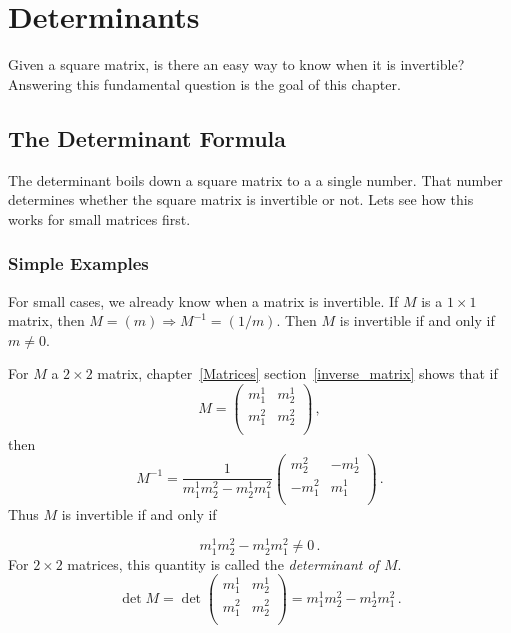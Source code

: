 \chapter{Determinants}\label{elementarydeterminants}

Given a square matrix, is there an easy way to know when it is invertible?  Answering this fundamental question is 
the goal of this chapter.

\section{The Determinant Formula}

The determinant boils down a square matrix to a a single number. That number determines whether the square matrix is invertible or not.  
Lets see how this works for small matrices first.

\subsection{Simple Examples}

For small cases, we already know when a matrix is invertible.  If $M$ is a $1\times 1$ matrix, then $M=(m) \Rightarrow M^{-1}=(1/m)$.  Then $M$ is invertible if and only if $m\neq 0$.

\vspace{.3cm}

For $M$ a $2\times 2$ matrix, chapter~\ref{Matrices} section~\ref{inverse_matrix} shows that if \[M=\begin{pmatrix}
m^1_1 & m^1_2 \\[1mm]
m^2_1 & m^2_2 \\
\end{pmatrix}\, ,\] then \[M^{-1}=\frac{1}{m^1_1m^2_2-m^1_2m^2_1}\begin{pmatrix}
m^2_2 & -m^1_2 \\[1mm]
-m^2_1 & m^1_1 \\
\end{pmatrix}\, .\] Thus $M$ is invertible if and only if 
\vspace{.3cm}

\[m^1_1m^2_2-m^1_2m^2_1\neq 0\, .\]  For $2\times 2$ matrices, this quantity is called the \emph{determinant of $M$}.
\[
\det M = \det \begin{pmatrix}
m^1_1 & m^1_2 \\[1mm]
m^2_1 & m^2_2 \\
\end{pmatrix} = m^1_1m^2_2-m^1_2m^2_1\, .
\]

